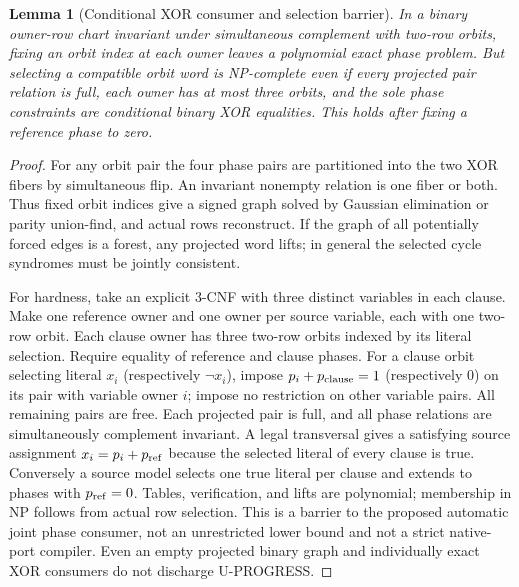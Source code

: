 \documentclass[11pt]{article}
\newtheorem{lemma}[theorem]{Lemma}
\begin{document}
\begin{lemma}[Conditional XOR consumer and selection barrier]\label{lem:i25-phase}
In a binary owner-row chart invariant under simultaneous complement with two-row orbits, fixing an orbit index at each owner leaves a polynomial exact phase problem. But selecting a compatible orbit word is NP-complete even if every projected pair relation is full, each owner has at most three orbits, and the sole phase constraints are conditional binary XOR equalities. This holds after fixing a reference phase to zero.
\end{lemma}
\begin{proof}
For any orbit pair the four phase pairs are partitioned into the two XOR fibers by simultaneous flip. An invariant nonempty relation is one fiber or both. Thus fixed orbit indices give a signed graph solved by Gaussian elimination or parity union-find, and actual rows reconstruct. If the graph of all potentially forced edges is a forest, any projected word lifts; in general the selected cycle syndromes must be jointly consistent.

For hardness, take an explicit 3-CNF with three distinct variables in each clause. Make one reference owner and one owner per source variable, each with one two-row orbit. Each clause owner has three two-row orbits indexed by its literal selection. Require equality of reference and clause phases. For a clause orbit selecting literal $x_i$ (respectively $\neg x_i$), impose $p_i+p_{\rm clause}=1$ (respectively $0$) on its pair with variable owner $i$; impose no restriction on other variable pairs. All remaining pairs are free. Each projected pair is full, and all phase relations are simultaneously complement invariant. A legal transversal gives a satisfying source assignment $x_i=p_i+p_{\rm ref}$ because the selected literal of every clause is true. Conversely a source model selects one true literal per clause and extends to phases with $p_{\rm ref}=0$. Tables, verification, and lifts are polynomial; membership in NP follows from actual row selection. This is a barrier to the proposed automatic joint phase consumer, not an unrestricted lower bound and not a strict native-port compiler. Even an empty projected binary graph and individually exact XOR consumers do not discharge U-PROGRESS.
\end{proof}
\end{document}
